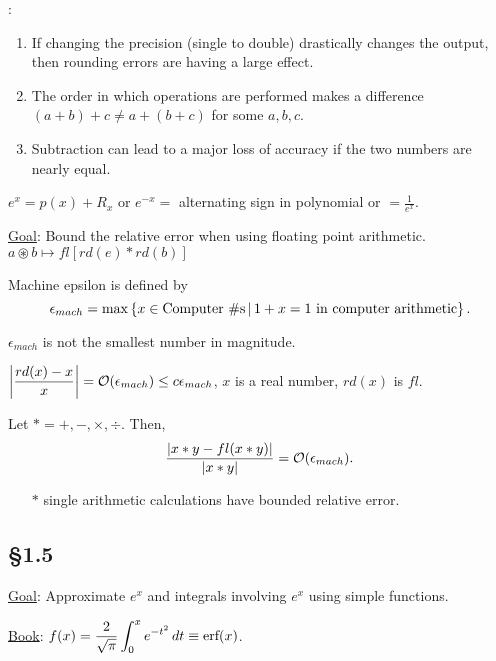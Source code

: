 \documentclass[]{article}
\begin{document}
\begin{note}
	:
	\begin{enumerate}
		\item If changing the precision (single to double) drastically changes the output, then rounding errors are having a large effect.
		\item The order in which operations are performed makes a difference $(a+b)+c\neq a+(b+c)$ for some $a,b,c$.
		\item Subtraction can lead to a major loss of accuracy if the two numbers are nearly equal.
	\end{enumerate}
	$e^x = p(x) + R_x$ or $e^{-x} = $ alternating sign in polynomial or $= \frac1{e^x}$.
\end{note}

\ul{Goal}: Bound the relative error when using floating point arithmetic.
$a\circledast b \mapsto fl[rd(e)*rd(b)]$

\begin{definition}
	Machine epsilon is defined by $$\epsilon_{mach} = \max\left\{ x\in\text{Computer \#s} \, \middle| \, 1+x = 1\text{ in computer arithmetic} \right\}.$$
\end{definition}
\begin{note}
	$\epsilon_{mach}$ is  not the smallest number in magnitude.
\end{note}
\begin{fact}
	$\displaystyle\left|\frac{rd(x)-x}{x}\right| = \mathcal{O}(\epsilon_{mach}) \leq c\epsilon_{mach}$, $x$ is a real number, $rd(x)$ is $fl$.
\end{fact}

\begin{theorem}
	 Let $* = +,-,\times,\div$. Then, $$\displaystyle\frac{|x*y-fl(x*y)|}{|x*y|} = \mathcal{O}(\epsilon_{mach}).$$
	\begin{enumerate}
		\item[$*$] single arithmetic calculations have bounded relative error.
	\end{enumerate}
\end{theorem}

\subsection*{\S1.5}

\ul{Goal}: Approximate $e^x$ and integrals involving $e^x$ using simple functions.

\ul{Book}: $\displaystyle f(x) = \frac2{\sqrt\pi}\int_0^x e^{-t^2}\,dt\equiv\text{erf}(x)$.
\end{document}
